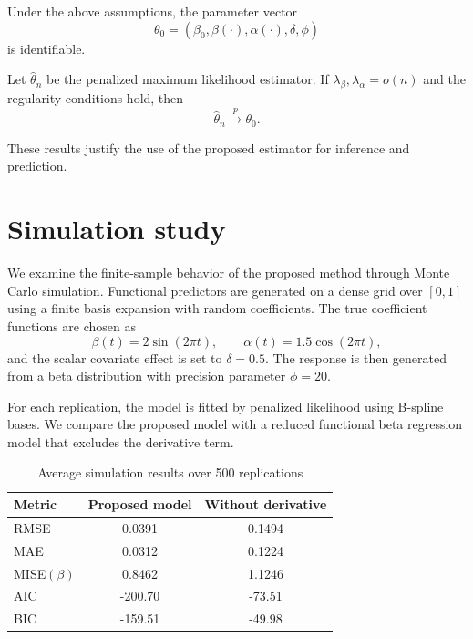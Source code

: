 \documentclass[twoside]{article}
\begin{document}
	\begin{pro}[Identifiability]
		Under the above assumptions, the parameter vector
		\[
		\theta_0=(\beta_0,\beta(\cdot),\alpha(\cdot),\delta,\phi)
		\]
		is identifiable.
	\end{pro}
	
	\begin{thm}[Consistency]
		Let $\hat{\theta}_n$ be the penalized maximum likelihood estimator. If $\lambda_\beta,\lambda_\alpha=o(n)$ and the regularity conditions hold, then
		\[
		\hat{\theta}_n \xrightarrow{p} \theta_0.
		\]
	\end{thm}
	
	These results justify the use of the proposed estimator for inference and prediction.
	
	\section{Simulation study}
	
	We examine the finite-sample behavior of the proposed method through Monte Carlo simulation. Functional predictors are generated on a dense grid over $[0,1]$ using a finite basis expansion with random coefficients. The true coefficient functions are chosen as
	\[
	\beta(t)=2\sin(2\pi t), \qquad
	\alpha(t)=1.5\cos(2\pi t),
	\]
	and the scalar covariate effect is set to $\delta=0.5$. The response is then generated from a beta distribution with precision parameter $\phi=20$.
	
	For each replication, the model is fitted by penalized likelihood using B-spline bases. We compare the proposed model with a reduced functional beta regression model that excludes the derivative term.
	
	\begin{table}[H]
		\centering
		\caption{Average simulation results over 500 replications}
		\renewcommand{\arraystretch}{1.15}
		\begin{tabular}{lcc}
			\toprule
			Metric & Proposed model & Without derivative \\
			\midrule
			RMSE & 0.0391 & 0.1494 \\
			MAE & 0.0312 & 0.1224 \\
			MISE$(\beta)$ & 0.8462 & 1.1246 \\
			AIC & -200.70 & -73.51 \\
			BIC & -159.51 & -49.98 \\
			\bottomrule
		\end{tabular}
	\end{table}
	
\end{document}
